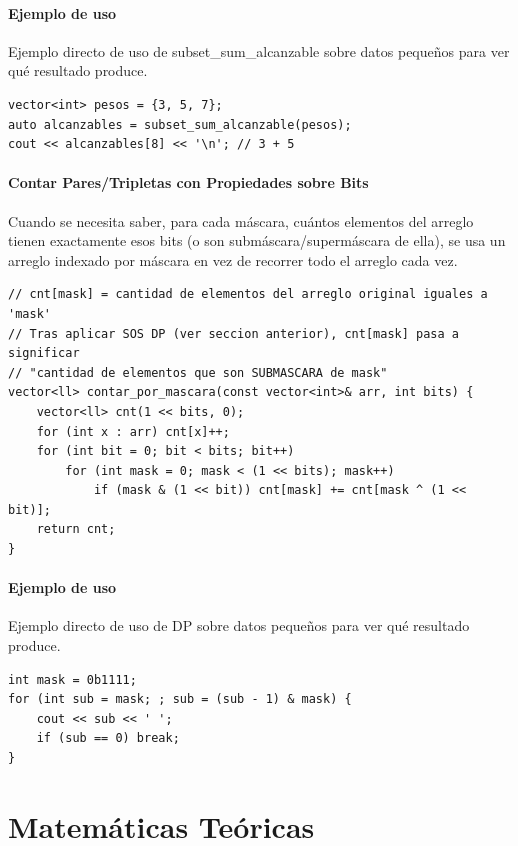 \documentclass[10pt,twocolumn,letterpaper]{report}
\begin{document}
\subsubsection*{Ejemplo de uso}
Ejemplo directo de uso de subset\_sum\_alcanzable sobre datos pequeños para ver qué resultado produce.
\begin{lstlisting}
vector<int> pesos = {3, 5, 7};
auto alcanzables = subset_sum_alcanzable(pesos);
cout << alcanzables[8] << '\n'; // 3 + 5
\end{lstlisting}

\subsubsection{Contar Pares/Tripletas con Propiedades sobre Bits}
Cuando se necesita saber, para cada máscara, cuántos elementos del arreglo tienen exactamente esos bits (o son submáscara/supermáscara de ella), se usa un arreglo indexado por máscara en vez de recorrer todo el arreglo cada vez.
\begin{lstlisting}
// cnt[mask] = cantidad de elementos del arreglo original iguales a 'mask'
// Tras aplicar SOS DP (ver seccion anterior), cnt[mask] pasa a significar
// "cantidad de elementos que son SUBMASCARA de mask"
vector<ll> contar_por_mascara(const vector<int>& arr, int bits) {
    vector<ll> cnt(1 << bits, 0);
    for (int x : arr) cnt[x]++;
    for (int bit = 0; bit < bits; bit++)
        for (int mask = 0; mask < (1 << bits); mask++)
            if (mask & (1 << bit)) cnt[mask] += cnt[mask ^ (1 << bit)];
    return cnt;
}
\end{lstlisting}
\subsubsection*{Ejemplo de uso}
Ejemplo directo de uso de DP sobre datos pequeños para ver qué resultado produce.
\begin{lstlisting}
int mask = 0b1111;
for (int sub = mask; ; sub = (sub - 1) & mask) {
    cout << sub << ' ';
    if (sub == 0) break;
}
\end{lstlisting}

\chapter{Matemáticas Teóricas}
\end{document}
